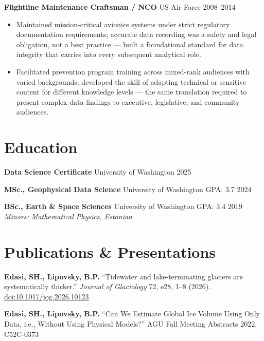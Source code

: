 \documentclass[11pt,a4paper]{article}
\begin{document}
\vspace{0.2cm}
\noindent
\textbf{Flightline Maintenance Craftsman / NCO} \hfill US Air Force \hfill 2008--2014
\begin{itemize}
    \item Maintained mission-critical avionics systems under strict regulatory documentation requirements; accurate data recording was a safety and legal obligation, not a best practice --- built a foundational standard for data integrity that carries into every subsequent analytical role.
    \item Facilitated prevention program training across mixed-rank audiences with varied backgrounds; developed the skill of adapting technical or sensitive content for different knowledge levels --- the same translation required to present complex data findings to executive, legislative, and community audiences.
\end{itemize}

\section*{Education}

\noindent
\textbf{Data Science Certificate} \hfill University of Washington \hfill 2025

\vspace{0.1cm}
\noindent
\textbf{MSc., Geophysical Data Science} \hfill University of Washington \hfill GPA: 3.7 \hfill 2024

\vspace{0.1cm}
\noindent
\textbf{BSc., Earth \& Space Sciences} \hfill University of Washington \hfill GPA: 3.4 \hfill 2019 \\
\textit{Minors: Mathematical Physics, Estonian}

\section*{Publications \& Presentations}

\noindent
\textbf{Edasi, SH., Lipovsky, B.P.} ``Tidewater and lake-terminating glaciers are systematically thicker.'' \textit{Journal of Glaciology} 72, e28, 1--8 (2026). \href{https://doi.org/10.1017/jog.2026.10123}{doi:10.1017/jog.2026.10123}

\noindent
\textbf{Edasi, SH., Lipovsky, B.P.} ``Can We Estimate Global Ice Volume Using Only Data, i.e., Without Using Physical Models?'' AGU Fall Meeting Abstracts 2022, C52C-0373
\end{document}
